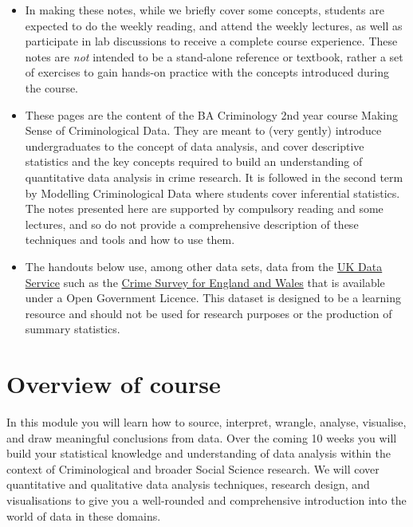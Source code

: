 \documentclass[
]{book}
\providecommand{\tightlist}{%
  \setlength{\itemsep}{0pt}\setlength{\parskip}{0pt}}
\begin{document}
\begin{itemize}
\tightlist
\item
  In making these notes, while we briefly cover some concepts, students are expected to do the weekly reading, and attend the weekly lectures, as well as participate in lab discussions to receive a complete course experience. These notes are \emph{not} intended to be a stand-alone reference or textbook, rather a set of exercises to gain hands-on practice with the concepts introduced during the course.
\item
  These pages are the content of the BA Criminology 2nd year course Making Sense of Criminological Data. They are meant to (very gently) introduce undergraduates to the concept of data analysis, and cover descriptive statistics and the key concepts required to build an understanding of quantitative data analysis in crime research. It is followed in the second term by Modelling Criminological Data where students cover inferential statistics. The notes presented here are supported by compulsory reading and some lectures, and so do not provide a comprehensive description of these techniques and tools and how to use them.
\item
  The handouts below use, among other data sets, data from the \href{https://ukdataservice.ac.uk/}{UK Data Service} such as the \href{https://beta.ukdataservice.ac.uk/datacatalogue/series/series?id=200009}{Crime Survey for England and Wales} that is available under a Open Government Licence. This dataset is designed to be a learning resource and should not be used for research purposes or the production of summary statistics.
\end{itemize}

\hypertarget{overview-of-course}{%
\section*{Overview of course}\label{overview-of-course}}

In this module you will learn how to source, interpret, wrangle, analyse, visualise, and draw meaningful conclusions from data. Over the coming 10 weeks you will build your statistical knowledge and understanding of data analysis within the context of Criminological and broader Social Science research. We will cover quantitative and qualitative data analysis techniques, research design, and visualisations to give you a well-rounded and comprehensive introduction into the world of data in these domains.
\end{document}
